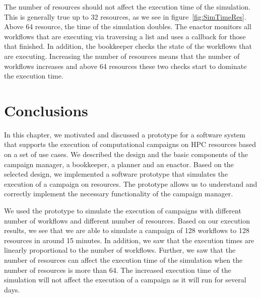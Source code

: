 The number of resources should not affect the execution time of the simulation.
This is generally true up to 32 resources, as we see in figure~\ref{fig:SimTimeRes}.
Above 64 resource, the time of the simulation doubles.
The enactor monitors all workflows that are executing via traversing a list and uses a callback for those that finished.
In addition, the bookkeeper checks the state of the workflows that are executing.
Increasing the number of resources means that the number of workflows increases and above 64 resources these two checks start to dominate the execution time.


\section{Conclusions}

In this chapter, we motivated and discussed a prototype for a software system that supports the execution of computational campaigns on HPC resources based on a set of use cases.
We described the design and the basic components of the campaign manager, a bookkeeper, a planner and an enactor.
Based on the selected design, we implemented a software prototype that simulates the execution of a campaign on resources.
The prototype allows us to understand and correctly implement the necessary functionality of the campaign manager.

We used the prototype to simulate the execution of campaigns with different number of workflows and different number of resources.
Based on our execution results, we see that we are able to simulate a campaign of 128 workflows to 128 resources in around 15 minutes.
In addition, we saw that the execution times are linearly proportional to the number of workflows.
Further, we saw that the number of resources can affect the execution time of the simulation when the number of resources is more than 64.
The increased execution time of the simulation will not affect the execution of a campaign as it will run for several days.
